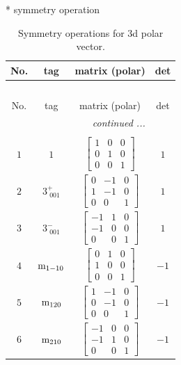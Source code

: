 \documentclass[fleqn,8pt]{jsarticle}
\begin{document}
* symmetry operation
\renewcommand{\arraystretch}{1.3}
\begin{longtable}{cccc}
\caption{Symmetry operations for 3d polar vector.}
 \\
 \hline \hline
No. & tag & matrix (polar) & det \\ \hline \endfirsthead

\multicolumn{3}{l}{\tablename\ \thetable{}} \\
 \hline \hline
No. & tag & matrix (polar) & det \\ \hline \endhead

 \hline \hline
\multicolumn{3}{r}{\footnotesize\it continued ...} \\ \endfoot

 \hline \hline
\multicolumn{3}{r}{} \\ \endlastfoot

$ 1 $ & $ 1 $ & $ \begin{bmatrix} 1 & 0 & 0 \\ 0 & 1 & 0 \\ 0 & 0 & 1 \end{bmatrix} $ & $ 1 $ \\ \hline
$ 2 $ & $ 3^{+}_{\,\,001} $ & $ \begin{bmatrix} 0 & -1 & 0 \\ 1 & -1 & 0 \\ 0 & 0 & 1 \end{bmatrix} $ & $ 1 $ \\ \hline
$ 3 $ & $ 3^{-}_{\,\,001} $ & $ \begin{bmatrix} -1 & 1 & 0 \\ -1 & 0 & 0 \\ 0 & 0 & 1 \end{bmatrix} $ & $ 1 $ \\ \hline
$ 4 $ & $ {\rm m}_{1-10} $ & $ \begin{bmatrix} 0 & 1 & 0 \\ 1 & 0 & 0 \\ 0 & 0 & 1 \end{bmatrix} $ & $ -1 $ \\ \hline
$ 5 $ & $ {\rm m}_{120} $ & $ \begin{bmatrix} 1 & -1 & 0 \\ 0 & -1 & 0 \\ 0 & 0 & 1 \end{bmatrix} $ & $ -1 $ \\ \hline
$ 6 $ & $ {\rm m}_{210} $ & $ \begin{bmatrix} -1 & 0 & 0 \\ -1 & 1 & 0 \\ 0 & 0 & 1 \end{bmatrix} $ & $ -1 $ \\
\end{longtable}
\end{document}

